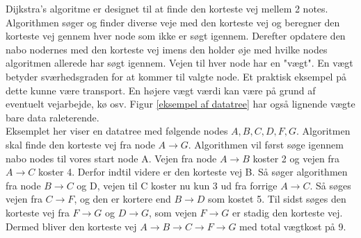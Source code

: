 \documentclass[12pt]{article}
\begin{document}
Dijkstra’s algoritme er designet til at finde den korteste vej mellem 2 notes. Algorithmen søger og finder diverse veje med den korteste vej og beregner den korteste vej gennem hver node som ikke er søgt igennem. Derefter opdatere den nabo nodernes med den korteste vej imens den holder øje med hvilke nodes algoritmen allerede har søgt igennem. Vejen til hver node har en "vægt". En vægt betyder sværhedsgraden for at kommer til valgte node. Et praktisk eksempel på dette kunne være transport. En højere vægt værdi kan være på grund af eventuelt vejarbejde, kø osv. Figur \ref{eksempel af datatree} har også lignende vægte bare data raleterende.
\\Eksemplet her viser en datatree med følgende nodes $A,B,C,D,F,G$. Algoritmen skal finde den korteste vej fra node $A \rightarrow G$. Algorithmen vil først søge igennem nabo nodes til vores start node A. Vejen fra node $A \rightarrow B$ koster 2 og vejen fra $A \rightarrow C$ koster 4. Derfor indtil videre er den korteste vej B. Så søger algorithmen fra node $B \rightarrow C$ og D, vejen til C koster nu kun 3 ud fra forrige $A \rightarrow C$. Så søges vejen fra $C \rightarrow F$, og den er kortere end $B \rightarrow D$ som kostet 5. Til sidst søges den korteste vej fra $F \rightarrow G$ og $D \rightarrow G$, som vejen $F \rightarrow G$ er stadig den korteste vej. Dermed bliver den korteste vej $A \rightarrow B \rightarrow C \rightarrow F \rightarrow G$ med total vægtkost på 9. 
\newpage


\end{document}
